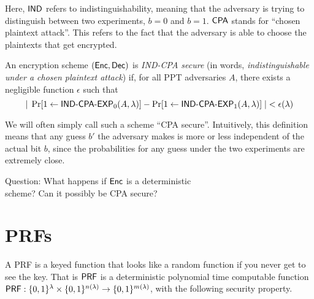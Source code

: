 Here, ${\sf IND}$ refers to indistinguishability, meaning that the adversary is trying to distinguish between two experiments, $b=0$ and $b=1$.  ${\sf CPA}$ stands for ``chosen plaintext attack''.  This refers to the fact that the adversary is able to choose the plaintexts that get encrypted.

\begin{definition} An encryption scheme $({\sf Enc},{\sf Dec})$ is \emph{{\sf IND-CPA} secure} (in words, \emph{indistinguishable under a chosen plaintext attack}) if, for all PPT adversaries $A$, there exists a negligible function $\epsilon$ such that
	\[|\;\Pr[1\gets\text{\sf IND-CPA-EXP}_0(A,\lambda)]-\Pr[1\gets\text{\sf IND-CPA-EXP}_1(A,\lambda)]\;|<\epsilon(\lambda)\]
\end{definition}

We will often simply call such a scheme ``CPA secure''.  Intuitively, this definition means that any guess $b'$ the adversary makes is more or less independent of the actual bit $b$, since the probabilities for any guess under the two experiments are extremely close.

\begin{center}
Question: What happens if ${\sf Enc}$ is a deterministic\\
 scheme?  Can it possibly be CPA secure?
\end{center}


\section{PRFs}

A PRF is a keyed function that looks like a random function if you never get to see the key.  That is ${\sf PRF}$ is a deterministic polynomial time computable function ${\sf PRF}:\{0,1\}^\lambda\times\{0,1\}^{n(\lambda)}\rightarrow\{0,1\}^{m(\lambda)}$, with the following security property.  

